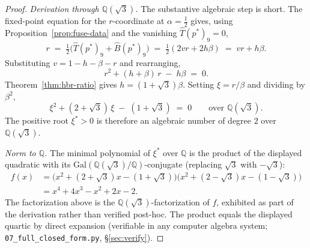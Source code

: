 \documentclass[11pt,reqno]{amsart}
\theoremstyle{plain}
\theoremstyle{definition}
\theoremstyle{remark}
\newcommand{\Q}{\mathbb{Q}}
\newcommand{\Tfuse}{\widehat{T}}
\newcommand{\Bfuse}{\widehat{B}}
\begin{document}
\begin{proof}
\textit{Derivation through $\Q(\sqrt{3})$.} The substantive
algebraic step is short. The fixed-point equation for the
$r$-coordinate at $\alpha = \tfrac12$ gives, using
Proposition~\ref{prop:fuse-data} and the vanishing
$\Tfuse(p^*)_{9} = 0$,
\[
  r \;=\; \tfrac12\bigl(\Tfuse(p^*)_{9} + \Bfuse(p^*)_{9}\bigr)
        \;=\; \tfrac12(2vr + 2 h\beta)
        \;=\; vr + h\beta.
\]
Substituting $v = 1 - h - \beta - r$ and rearranging,
\[
  r^{2} + (h + \beta)\, r \;-\; h\beta \;=\; 0.
\]
Theorem~\ref{thm:hbr-ratio} gives $h = (1+\sqrt{3})\beta$. Setting
$\xi = r/\beta$ and dividing by $\beta^{2}$,
\[
  \xi^{2} + (2+\sqrt{3})\,\xi \;-\; (1+\sqrt{3}) \;=\; 0
  \qquad\text{over }\Q(\sqrt{3}).
\]
The positive root $\xi^* > 0$ is therefore an algebraic number of
degree $2$ over $\Q(\sqrt{3})$.

\textit{Norm to $\Q$.} The minimal polynomial of $\xi^*$ over $\Q$
is the product of the displayed quadratic with its
$\mathrm{Gal}(\Q(\sqrt{3})/\Q)$-conjugate
(replacing $\sqrt{3}$ with $-\sqrt{3}$):
\begin{align*}
  f(x)
  &= \bigl(x^{2} + (2+\sqrt{3})x - (1+\sqrt{3})\bigr)
     \bigl(x^{2} + (2-\sqrt{3})x - (1-\sqrt{3})\bigr) \\
  &= x^{4} + 4x^{3} - x^{2} + 2x - 2.
\end{align*}
The factorization above is the
$\Q(\sqrt{3})$-factorization of $f$, exhibited as part of the
derivation rather than verified post-hoc. The product equals
the displayed quartic by direct expansion (verifiable in any
computer algebra system; \texttt{07\_full\_closed\_form.py},
\S\ref{sec:verify}).


\end{proof}
\end{document}
